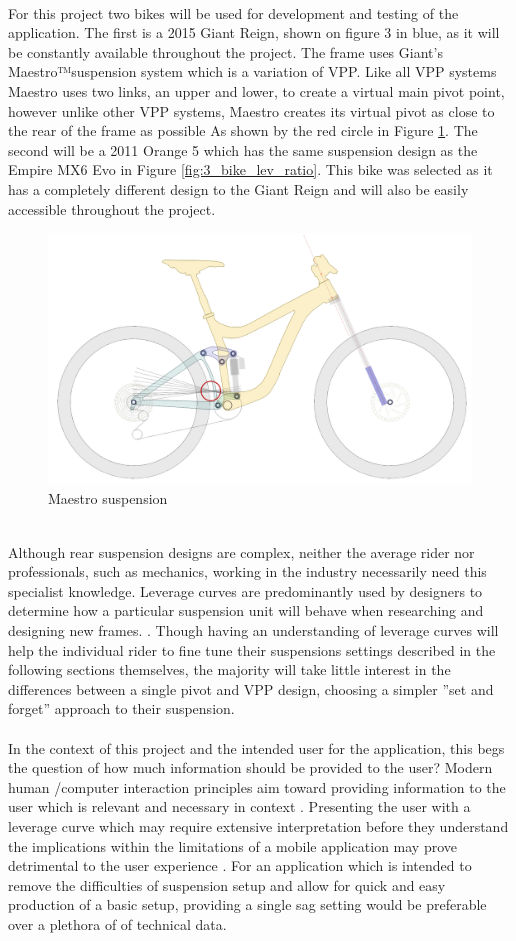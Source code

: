 		\\
		For this project two bikes will be used for development and testing of the application. The first is a 2015 Giant Reign, shown on figure 3 in blue, as it will be constantly available throughout the project. The frame uses Giant’s Maestro™suspension system which is a variation of VPP. Like all VPP systems Maestro uses two links, an upper and lower, to create a virtual main pivot point, however unlike other VPP systems, Maestro creates its virtual pivot as close to the rear of the frame as possible As shown by the red circle in Figure \ref{fig:maestro}. The second will be a 2011 Orange 5 which has the same suspension design as the Empire MX6 Evo in Figure \ref{fig:3_bike_lev_ratio}. This bike was selected as it has a completely different design to the Giant Reign and will also be easily accessible throughout the project. 
		\begin{figure}[h!]
			\centering
			\includegraphics[width=12cm]{../images/reignsch.PNG}
			\caption{Maestro suspension}
			\label{fig:maestro}
		\end{figure}
		\\
		Although rear suspension designs are complex, neither the average rider nor professionals, such as mechanics, working in the industry necessarily need this specialist knowledge. Leverage curves are predominantly used by designers to determine how a particular suspension unit will behave when researching and designing new frames. . Though having an understanding of leverage curves will help the individual rider to fine tune their suspensions settings described in the following sections themselves, the majority will take little interest in the differences between a single pivot and VPP design, choosing a simpler ”set and forget” approach to their suspension. 
		\\\\
		In the context of this project and the intended user for the application, this begs the question of how much information should be provided to the user? Modern human /computer interaction principles aim toward providing information to the user which is relevant and necessary in context . Presenting the user with a leverage curve which may require extensive interpretation before they understand the implications within the limitations of a mobile application may prove detrimental to the user experience . For an application which is intended to remove the difficulties of suspension setup and allow for quick and easy production of a basic setup, providing a single sag setting would be preferable over a plethora of of technical data.	

